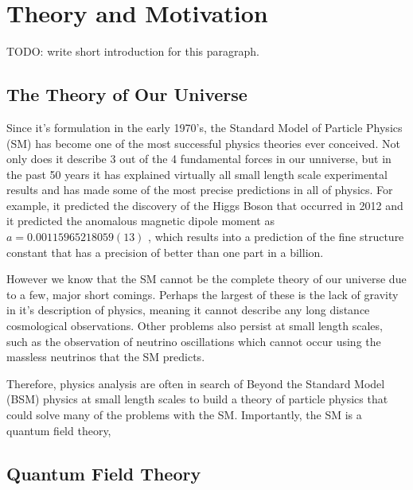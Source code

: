 \chapter{Theory and Motivation}

TODO: write short introduction for this paragraph.

\section{The Theory of Our Universe}

Since it's formulation in the early 1970's, the Standard Model of Particle Physics (SM) has become one of the most successful physics theories ever conceived. Not only does it describe 3 out of the 4 fundamental forces in our unniverse, but in the past 50 years it has explained virtually all small length scale experimental results and has made some of the most precise predictions in all of physics. For example, it predicted the discovery of the Higgs Boson that occurred in 2012 \cite{ref:cms2012observation}\cite{ref:atlas2012observation} and it predicted the anomalous magnetic dipole moment as $a = 0.00115965218059(13)$ \cite{ref:fan_2023}, which results into a prediction of the fine structure constant that has a precision of better than one part in a billion.

However we know that the SM cannot be the complete theory of our universe due to a few, major short comings. Perhaps the largest of these is the lack of gravity in it's description of physics, meaning it cannot describe any long distance cosmological observations. Other problems also persist at small length scales, such as the observation of neutrino oscillations \cite{ref:duan2010collective} which cannot occur using the massless neutrinos that the SM predicts. 

Therefore, physics analysis are often in search of Beyond the Standard Model (BSM) physics at small length scales to build a theory of particle physics that could solve many of the problems with the SM. Importantly, the SM is a quantum field theory, 

\section{Quantum Field Theory \cite{ref:harlow2024}}

